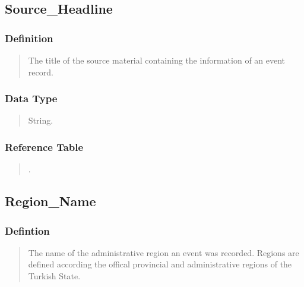\documentclass[letterpaper,10pt,english]{sphinxmanual}
\begin{document}
\subsection{Source\_Headline}
\label{\detokenize{database_schema:source-headline}}

\subsubsection{Definition}
\label{\detokenize{database_schema:id20}}\begin{quote}

\sphinxAtStartPar
The title of the source material containing the information of an event record.
\end{quote}


\subsubsection{Data Type}
\label{\detokenize{database_schema:id21}}\begin{quote}

\sphinxAtStartPar
String.
\end{quote}


\subsubsection{Reference Table}
\label{\detokenize{database_schema:id22}}\begin{quote}

\sphinxAtStartPar
{\hyperref[\detokenize{database_schema:overview-table}]{}}.
\end{quote}


\subsection{Region\_Name}
\label{\detokenize{database_schema:region-name}}

\subsubsection{Defintion}
\label{\detokenize{database_schema:defintion}}\begin{quote}

\sphinxAtStartPar
The name of the administrative region an event was recorded.  Regions are defined according the offical provincial and administrative regions of the Turkish State.
\end{quote}
\end{document}
